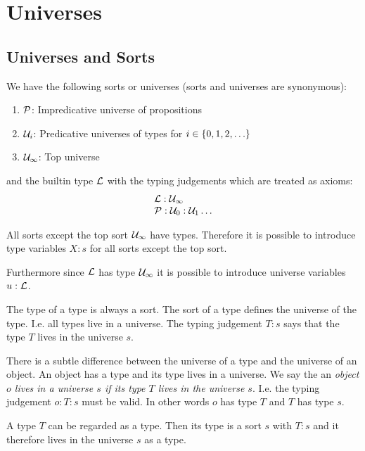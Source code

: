 \section{Universes}





\subsection{Universes and Sorts}


We have the following sorts or universes (sorts and universes are synonymous):
\begin{enumerate}
\item ${\mathcal P}$: Impredicative universe of propositions

\item ${\mathcal U}_i$: Predicative universes of types for $i \in {\{0, 1, 2, \ldots\}}$

\item ${\mathcal U}_\infty$: Top universe
\end{enumerate}
and the builtin type ${\mathcal L}$ with the typing judgements which are treated as
axioms:
$$
\begin{array}{l}
    {\mathcal L} : {\mathcal U}_\infty
    \\
    {\mathcal P} : {\mathcal U}_0 : {\mathcal U}_1 \ldots
\end{array}
$$


All sorts except the top sort ${\mathcal U}_\infty$ have types. Therefore it is
possible to introduce type variables $X: s$ for all sorts except the top sort.

Furthermore since ${\mathcal L}$ has type ${\mathcal U}_\infty$ it is possible to introduce
universe variables $u: {\mathcal L}$.

The type of a type is always a sort. The sort of a type defines the
universe of the type. I.e. all types live in a universe. The typing judgement
$T: s$ says that the type $T$ lives in the universe $s$.


There is a subtle difference between the universe of a type and the universe of
an object. An object has a type and its type lives in a universe. We say the an
\emph{object $o$ lives in a universe $s$ if its type $T$ lives in the universe
$s$}. I.e. the typing judgement $o : T : s$ must be valid. In other words $o$
has type $T$ and $T$ has type $s$.

A type $T$ can be regarded as a type. Then its type is a sort $s$ with $T : s$
and it therefore lives in the universe $s$ as a type.

